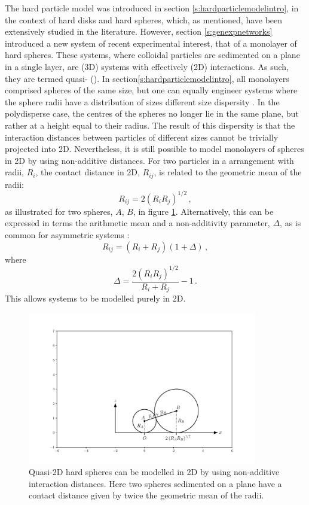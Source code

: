 The hard particle model was introduced in section  \ref{s:hardparticlemodelintro}, in the context of hard disks and hard spheres, which, as mentioned, have been extensively studied in the literature.
However, section \ref{s:genexpnetworks} introduced a new system of recent experimental interest, that of a monolayer of hard spheres.
These systems, where colloidal particles are sedimented on a plane in a single layer, are \thd{} (3D) systems with effectively \td{} (2D) interactions.
As such, they are termed quasi\--\td{} (\qtd{}).
In section\ref{s:hardparticlemodelintro}, all monolayers comprised spheres of the same size, but one can equally engineer systems where the sphere radii have a distribution of sizes \ie{} different size dispersity \cite{Thorneywork2014,Thorneywork2018}.
In the polydisperse case, the centres of the spheres no longer lie in the same plane, but rather at a height equal to their radius.
The result of this dispersity is that the interaction distances between particles of different sizes cannot be trivially projected into 2D.
Nevertheless, it is still possible to model monolayers of spheres in 2D by using non\--additive distances.
For two particles in a \qtd{} arrangement with radii, $R_i$, the contact distance in 2D, $R_{ij}$, is related to the geometric mean of the radii:
\begin{equation}
	R_{ij}=2\left(R_iR_j\right)^{1/2}\,,
\end{equation}
as  illustrated for two spheres, $A$, $B$, in figure \ref{fig:nonadddemo}.
Alternatively, this can be expressed in terms the arithmetic mean and a non\--additivity parameter, $\Delta$, as is common for asymmetric systems \cite{Roth2001}:
\begin{equation}
	R_{ij}=\left(R_i+R_j\right)\left(1+\Delta\right)\,,
\end{equation}
where
\begin{equation}
	\Delta=\frac{2\left(R_iR_j\right)^{1/2}}{R_i+R_j}-1\,.
\end{equation}
This allows \qtd{} systems to be modelled purely in 2D.

\begin{figure}[bth]
     \centering
     
     \includegraphics[width=10cm]{./figures/quasi2d/quasi2d_a.pdf}
     \caption{Quasi\--2D hard spheres can be modelled in 2D by using non\--additive interaction distances. Here two spheres sedimented on a plane have a contact distance given by twice the geometric mean of the radii.}
     \label{fig:nonadddemo}
\end{figure}

